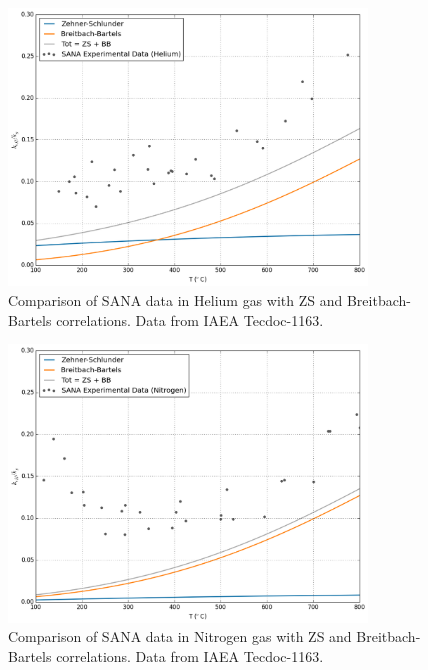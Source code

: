 \begin{figure}[ht]
    \centering
    \includegraphics[width=0.85\textwidth]{figures/keff-sana-he}
    \caption{Comparison of SANA data in Helium gas with ZS and Breitbach-Bartels correlations. Data from IAEA Tecdoc-1163\cite{Report2000}.}
    \label{fig:keff-sana-he}
\end{figure}
\begin{figure}[ht]
    \centering
    \includegraphics[width=0.85\textwidth]{figures/keff-sana-n}
    \caption{Comparison of SANA data in Nitrogen gas with ZS and Breitbach-Bartels correlations. Data from IAEA Tecdoc-1163\cite{Report2000}.}
    \label{fig:keff-sana-n}
\end{figure}








